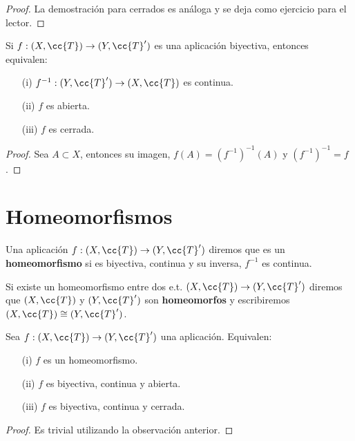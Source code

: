 \begin{ejemplo}
\begin{itemize}
\begin{proof}
            La demostración para cerrados es análoga y se deja como ejercicio para el lector.
        \end{proof}
    \end{itemize}
\end{ejemplo}

\begin{observacion}
    Si $f:(X, \cc{T})\to(Y, \cc{T}')$ es una aplicación biyectiva, entonces equivalen:
    \begin{enumerate}
        \item[(i)] $f^{-1}:(Y, \cc{T}')\to (X, \cc{T})$ es continua.
        \item[(ii)] $f$ es abierta.
        \item[(iii)] $f$ es cerrada. 
    \end{enumerate}
    \begin{proof}
        Sea $A\subset X$, entonces su imagen, $f(A)=(f^{-1})^{-1}(A)$ y $(f^{-1})^{-1}=f$.


    \end{proof}
\end{observacion}

\section{Homeomorfismos}

\begin{definicion}
    Una aplicación $f:(X, \cc{T})\to (Y, \cc{T}')$ diremos que es un \textbf{homeomorfismo} si es biyectiva, continua y su inversa, $f^{-1}$ es continua.

    Si existe un homeomorfismo entre dos e.t. $(X, \cc{T})\to (Y, \cc{T}')$ diremos que $(X, \cc{T})$ y $(Y, \cc{T}')$ son \textbf{homeomorfos} y escribiremos $(X, \cc{T}) \cong (Y, \cc{T}')$.
    \endsquare
\end{definicion}

\begin{teo}
    Sea $f:(X, \cc{T})\to (Y, \cc{T}')$ una aplicación. Equivalen:
    \begin{enumerate}
        \item[(i)] $f$ es un homeomorfismo.
        \item[(ii)] $f$ es biyectiva, continua y abierta.
        \item[(iii)] $f$ es biyectiva, continua y cerrada.  
    \end{enumerate}
    \begin{proof}
        Es trivial utilizando la observación anterior.
    \end{proof}
\end{teo}

